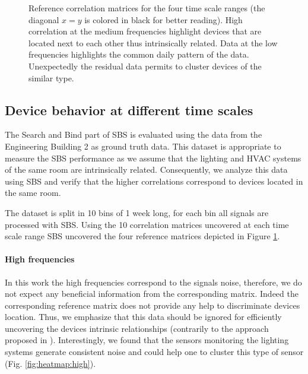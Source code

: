 \begin{figure}[t!]
\caption{Reference correlation matrices for the four time scale ranges (the diagonal $x=y$ is colored in black for better reading). High correlation at the medium frequencies highlight devices that are located next to each other thus intrinsically related. Data at the low frequencies highlights the common daily pattern of the data. Unexpectedly the residual data permits to cluster devices of the similar type.}
\label{fig:heatmap}
\end{figure}

\subsection{Device behavior at different time scales}
The Search and Bind part of SBS is evaluated using the data from the Engineering Building 2 as ground truth data.
This dataset is appropriate to measure the SBS performance as we assume that the lighting and HVAC systems of the same room are intrinsically related.
Consequently, we analyze this data using SBS and verify that the higher correlations correspond to devices located in the same room.

The dataset is split in 10 bins of 1 week long, for each bin all signals are processed with SBS.
Using the 10 correlation matrices uncovered at each time scale range SBS uncovered the four reference matrices depicted in Figure \ref{fig:heatmap}.

\paragraph{High frequencies}
In this work the high frequencies correspond to the signals noise, therefore, we do not expect any beneficial information from the corresponding matrix.
Indeed the corresponding reference matrix does not provide any help to discriminate devices location.
Thus, we emphasize that this data should be ignored for efficiently uncovering the devices intrinsic relationships (contrarily to the approach proposed in \cite{romain:iotapp12}).
Interestingly, we found that the sensors monitoring the lighting systems generate consistent noise and could help one to cluster this type of sensor (Fig. \ref{fig:heatmap:high}).
  
